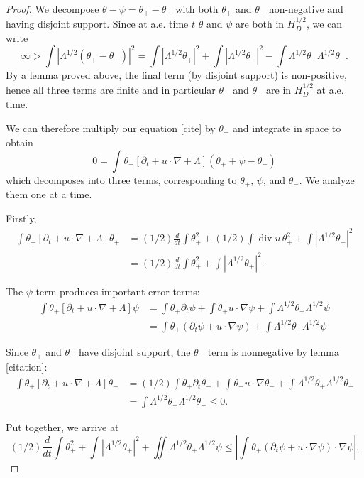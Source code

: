 \documentclass[11pt]{amsart}
\theoremstyle{remark}
\newcommand{\paren}[1]{\left( #1 \right)}
\newcommand{\bracket}[1]{\left[ #1 \right]}
\newcommand{\abs}[1]{\left\lvert #1 \right\rvert}
\newcommand{\del}{\partial}
\newcommand{\grad}{\nabla}
\newcommand{\ddt}{\frac{d}{dt}}
\renewcommand{\div}{\operatorname{div}}
\begin{document}
\begin{proof}
We decompose $\theta-\psi = \theta_+ - \theta_-$ with both $\theta_+$ and $\theta_-$ non-negative and having disjoint support.  Since at a.e. time $t$ $\theta$ and $\psi$ are both in $H_D^{1/2}$, we can write
\[ \infty > \int \abs{\Lambda^{1/2}(\theta_+-\theta_-)}^2 = \int \abs{\Lambda^{1/2}\theta_+}^2 + \int \abs{\Lambda^{1/2} \theta_-}^2 - \int \Lambda^{1/2} \theta_+ \Lambda^{1/2} \theta_-. \]
By a lemma proved above, the final term (by disjoint support) is non-positive, hence all three terms are finite and in particular $\theta_+$ and $\theta_-$ are in $H_D^{1/2}$ at a.e. time.  

We can therefore multiply our equation [cite] by $\theta_+$ and integrate in space to obtain
\[ 0 = \int \theta_+ \bracket{ \del_t + u \cdot \grad + \Lambda } \paren{\theta_+ + \psi - \theta_-} \]
which decomposes into three terms, corresponding to $\theta_+$, $\psi$, and $\theta_-$.  We analyze them one at a time.  

Firstly,
\begin{align*} 
\int \theta_+ \bracket{ \del_t + u \cdot \grad + \Lambda } \theta_+ &= (1/2) \ddt \int \theta_+^2 + (1/2) \int \div u \, \theta_+^2 + \int \abs{\Lambda^{1/2} \theta_+}^2
\\ &= (1/2) \ddt \int \theta_+^2 + \int \abs{\Lambda^{1/2} \theta_+}^2.
\end{align*}

The $\psi$ term produces important error terms:
\begin{align*} 
\int \theta_+ \bracket{ \del_t + u \cdot \grad + \Lambda } \psi &= \int \theta_+ \del_t \psi + \int \theta_+ u \cdot \grad \psi + \int \Lambda^{1/2} \theta_+ \Lambda^{1/2} \psi
\\ &= \int \theta_+ (\del_t \psi + u \cdot \grad \psi) + \int \Lambda^{1/2} \theta_+ \Lambda^{1/2} \psi
\end{align*}

Since $\theta_+$ and $\theta_-$ have disjoint support, the $\theta_-$ term is nonnegative by lemma [citation]:
\begin{align*} 
\int \theta_+ \bracket{ \del_t + u \cdot \grad + \Lambda } \theta_- &= (1/2) \int \theta_+ \del_t \theta_- + \int \theta_+ u \cdot \grad \theta_- + \int \Lambda^{1/2} \theta_+ \Lambda^{1/2} \theta_-
\\ &= \int \Lambda^{1/2} \theta_+ \Lambda^{1/2} \theta_- \leq 0.
\end{align*}

Put together, we arrive at 
\[ (1/2) \ddt \int \theta_+^2 + \int \abs{\Lambda^{1/2} \theta_+}^2 + \iint \Lambda^{1/2} \theta_+ \Lambda^{1/2} \psi \leq \abs{\int \theta_+ (\del_t \psi + u \cdot \grad \psi) \cdot \grad \psi}. \]


\end{proof}
\end{document}
